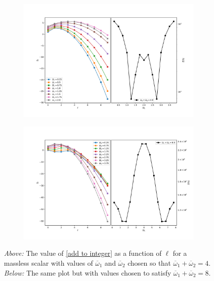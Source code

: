 \documentclass[letterpaper,11pt]{article}
\newcommand{\oone}{\overline{\omega}_1}
\newcommand{\otwo}{\overline{\omega}_2}
\begin{document}
\begin{figure}[h!]
\centering
	\begin{subfigure}[b]{0.75\textwidth}
		\includegraphics[width=\textwidth]{./figures/NNAddToInteger_source_n2_m0_0}
		\label{fig:atoi_all_n2_m0}
	\end{subfigure}
	\vspace{-0.25in}
	\begin{subfigure}[b]{0.75\textwidth}
		\includegraphics[width=\textwidth]{./figures/NNAddToInteger_source_n4_m0_0}
		\label{fig:atoi_all_n4_m0}
	\end{subfigure}
	\caption{{\it Above:} The value of \eqref{add to integer} as a function of $\ell$ for a massless scalar with values of $\oone$ and $\otwo$ chosen so that $\oone + \otwo = 4$. {\it Below:} The same plot but with values chosen to satisfy $\oone + \otwo = 8$.}
	\label{fig:atoi_all_m0_0compare}
\end{figure}
\end{document}
